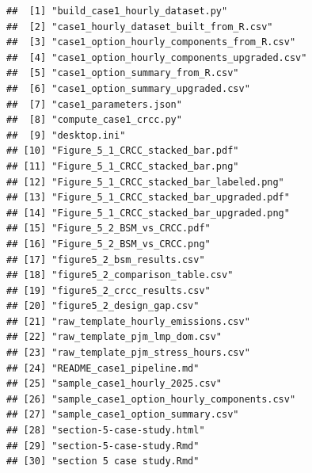 \documentclass[
]{article}
\begin{document}
\begin{verbatim}
##  [1] "build_case1_hourly_dataset.py"              
##  [2] "case1_hourly_dataset_built_from_R.csv"      
##  [3] "case1_option_hourly_components_from_R.csv"  
##  [4] "case1_option_hourly_components_upgraded.csv"
##  [5] "case1_option_summary_from_R.csv"            
##  [6] "case1_option_summary_upgraded.csv"          
##  [7] "case1_parameters.json"                      
##  [8] "compute_case1_crcc.py"                      
##  [9] "desktop.ini"                                
## [10] "Figure_5_1_CRCC_stacked_bar.pdf"            
## [11] "Figure_5_1_CRCC_stacked_bar.png"            
## [12] "Figure_5_1_CRCC_stacked_bar_labeled.png"    
## [13] "Figure_5_1_CRCC_stacked_bar_upgraded.pdf"   
## [14] "Figure_5_1_CRCC_stacked_bar_upgraded.png"   
## [15] "Figure_5_2_BSM_vs_CRCC.pdf"                 
## [16] "Figure_5_2_BSM_vs_CRCC.png"                 
## [17] "figure5_2_bsm_results.csv"                  
## [18] "figure5_2_comparison_table.csv"             
## [19] "figure5_2_crcc_results.csv"                 
## [20] "figure5_2_design_gap.csv"                   
## [21] "raw_template_hourly_emissions.csv"          
## [22] "raw_template_pjm_lmp_dom.csv"               
## [23] "raw_template_pjm_stress_hours.csv"          
## [24] "README_case1_pipeline.md"                   
## [25] "sample_case1_hourly_2025.csv"               
## [26] "sample_case1_option_hourly_components.csv"  
## [27] "sample_case1_option_summary.csv"            
## [28] "section-5-case-study.html"                  
## [29] "section-5-case-study.Rmd"                   
## [30] "section 5 case study.Rmd"
\end{verbatim}
\end{document}
